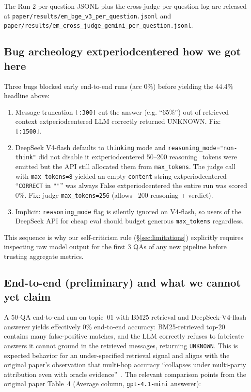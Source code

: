 The Run 2 per-question JSONL plus the cross-judge per-question log are
released at \texttt{paper/results/em\_bge\_v3\_per\_question.jsonl} and
\texttt{paper/results/em\_cross\_judge\_gemini\_per\_question.jsonl}.

\subsection{Bug archeology 	extperiodcentered{}  how we got here}

Three bugs blocked early end-to-end runs (acc 0\%) before yielding
the 44.4\% headline above:

\begin{enumerate}
\item Message truncation \texttt{[:300]} cut the answer (e.g. ``65\%'')
out of retrieved context 	extperiodcentered{}  LLM correctly returned UNKNOWN. Fix:
\texttt{[:1500]}.
\item DeepSeek V4-flash defaults to \texttt{thinking} mode and
\texttt{reasoning\_mode="non-think"} did not disable it 	extperiodcentered{}  50--200
reasoning\_tokens were emitted but the API still allocated them
from \texttt{max\_tokens}. The judge call with \texttt{max\_tokens=8}
yielded an empty \texttt{content} string 	extperiodcentered{}  ``\texttt{CORRECT} in
\texttt{""}'' was always False 	extperiodcentered{}  the entire run was scored 0\%.
Fix: judge \texttt{max\_tokens=256} (allows ~200 reasoning + verdict).
\item Implicit: \texttt{reasoning\_mode} flag is silently ignored on
V4-flash, so users of the DeepSeek API for cheap eval should budget
generous \texttt{max\_tokens} regardless.
\end{enumerate}

This sequence is why our self-criticism rule (\S\ref{sec:limitations})
explicitly requires inspecting raw model output for the first 3 QAs of
any new pipeline before trusting aggregate metrics.

\subsection{End-to-end (preliminary) and what we cannot yet claim}

A 50-QA end-to-end run on topic~01 with BM25 retrieval and
DeepSeek-V4-flash answerer yields effectively 0\% end-to-end
accuracy: BM25-retrieved top-20 contains many false-positive
matches, and the LLM correctly refuses to fabricate answers it cannot
ground in the retrieved messages, returning \texttt{UNKNOWN}. This is
expected behavior for an under-specified retrieval signal and aligns
with the original paper's observation that multi-hop accuracy
``collapses under multi-party attribution even with oracle
evidence''~\citep[\S4.2]{hu2026evermembench}. The relevant comparison
points from the original paper Table~4 (Average column,
\texttt{gpt-4.1-mini} answerer):

